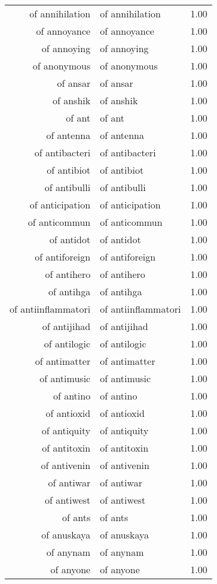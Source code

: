 \begin{table}[ht]
\begin{tabular}{rlr}
  of annihilation & of annihilation & 1.00 \\ 
  of annoyance & of annoyance & 1.00 \\ 
  of annoying & of annoying & 1.00 \\ 
  of anonymous & of anonymous & 1.00 \\ 
  of ansar & of ansar & 1.00 \\ 
  of anshik & of anshik & 1.00 \\ 
  of ant & of ant & 1.00 \\ 
  of antenna & of antenna & 1.00 \\ 
  of antibacteri & of antibacteri & 1.00 \\ 
  of antibiot & of antibiot & 1.00 \\ 
  of antibulli & of antibulli & 1.00 \\ 
  of anticipation & of anticipation & 1.00 \\ 
  of anticommun & of anticommun & 1.00 \\ 
  of antidot & of antidot & 1.00 \\ 
  of antiforeign & of antiforeign & 1.00 \\ 
  of antihero & of antihero & 1.00 \\ 
  of antihga & of antihga & 1.00 \\ 
  of antiinflammatori & of antiinflammatori & 1.00 \\ 
  of antijihad & of antijihad & 1.00 \\ 
  of antilogic & of antilogic & 1.00 \\ 
  of antimatter & of antimatter & 1.00 \\ 
  of antimusic & of antimusic & 1.00 \\ 
  of antino & of antino & 1.00 \\ 
  of antioxid & of antioxid & 1.00 \\ 
  of antiquity & of antiquity & 1.00 \\ 
  of antitoxin & of antitoxin & 1.00 \\ 
  of antivenin & of antivenin & 1.00 \\ 
  of antiwar & of antiwar & 1.00 \\ 
  of antiwest & of antiwest & 1.00 \\ 
  of ants & of ants & 1.00 \\ 
  of anuskaya & of anuskaya & 1.00 \\ 
  of anynam & of anynam & 1.00 \\ 
  of anyone & of anyone & 1.00 \\ 

\end{tabular}
\end{table}
